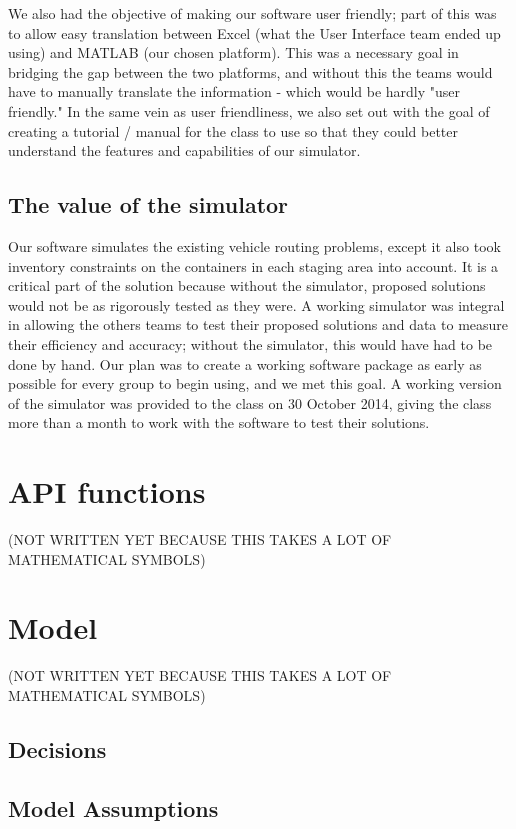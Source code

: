 \documentclass{article}
\begin{document}
We also had the objective of making our software user friendly; part of this was to allow easy translation between Excel (what the User Interface team ended up using) and MATLAB (our chosen platform).  This was a necessary goal in bridging the gap between the two platforms, and without this the teams would have to manually translate the information - which would be hardly "user friendly."  In the same vein as user friendliness, we also set out with the goal of creating a tutorial / manual for the class to use so that they could better understand the features and capabilities of our simulator.


\subsection{The value of the simulator}

Our software simulates the existing vehicle routing problems, except it also took inventory constraints on the containers in each staging area into account.  It is a critical part of the solution because without the simulator, proposed solutions would not be as rigorously tested as they were. A working simulator was integral in allowing the others teams to test their proposed solutions and data to measure their efficiency and accuracy; without the simulator, this would have had to be done by hand.  Our plan was to create a working software package as early as possible for every group to begin using, and we met this goal. A working version of the simulator was provided to the class on 30 October 2014, giving the class more than a month to work with the software to test their solutions.

\section{API functions}

(NOT WRITTEN YET BECAUSE THIS TAKES A LOT OF MATHEMATICAL SYMBOLS)

\section{Model}

(NOT WRITTEN YET BECAUSE THIS TAKES A LOT OF MATHEMATICAL SYMBOLS)

\subsection{Decisions}
\subsection{Model Assumptions}
\end{document}
